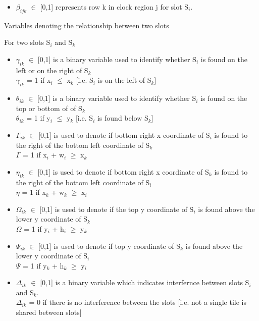 \begin{itemize}
\item $\beta_{ijk}$ $\in$ [0,1] represents row k in clock region j for slot S$_i$.
\end{itemize}
\hfill \break
Variables denoting the relationship between two slots 

For two slots S$_i$ and S$_k$ 
\begin{itemize}
\item $\gamma_{ik}$ $\in$ [0,1] is a binary variable used to identify whether S$_i$ is found on the left or on the right of S$_k$\\
$\gamma_{ik}$ = 1 if x$_i$ $\leq$ x$_k$ [i.e. S$_i$ is on the left of S$_k$]

\item $\theta_{ik}$ $\in$ [0,1] is a binary variable used to identify whether S$_i$ is found on the top or bottom of of S$_k$\\
$\theta_{ik}$ = 1 if y$_i$ $\leq$ y$_k$ [i.e. S$_i$ is found below S$_k$]

\item $\Gamma_{ik}$ $\in$ [0,1] is used to denote if bottom right x coordinate of S$_i$ is found to the right of the bottom left coordinate of S$_k$ \\
$\Gamma$ = 1 if x$_i$ + w$_i$ $\geq$ x$_k$

\item $\eta_{ik}$ $\in$ [0,1] is used to denote if bottom right x coordinate of S$_k$ is found to the right of the bottom left coordinate of S$_i$ \\
$\eta$ = 1 if x$_k$ + w$_k$ $\geq$ x$_i$

\item $\Omega_{ik}$ $\in$ [0,1] is used to denote if the top y coordinate of S$_i$ is found above the lower y coordinate of S$_k$ \\
$\Omega$ = 1 if y$_i$ + h$_i$ $\geq$ y$_k$

\item $\Psi_{ik}$ $\in$ [0,1] is used to denote if top y coordinate of S$_k$ is found above the lower y coordinate of S$_i$ \\
$\Psi$ = 1 if y$_k$ + h$_k$ $\geq$ y$_i$


\item $\Delta_{ik}$ $\in$ [0,1] is a binary variable which indicates interfernce between slots S$_i$ and S$_k$.\\
$\Delta_{ik}$ = 0 if there is no interference between the slots [i.e. not a single tile is shared between slots]


\end{itemize}

